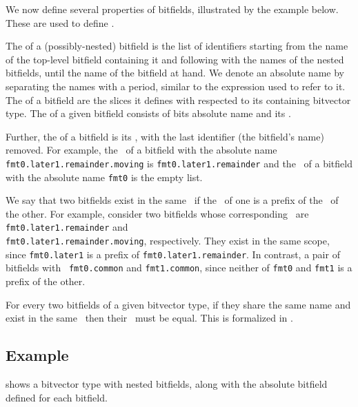 We now define several properties of bitfields, illustrated by the example below.
These are used to define .

The \hypertarget{def-absolutename}{\absolutename} of a (possibly-nested) bitfield is the list of identifiers starting from the
name of the top-level bitfield containing it and following with the names of the nested bitfields,
until the name of the bitfield at hand. We denote an absolute name by separating the names with a
period, similar to the expression used to refer to it.
%
The \hypertarget{def-absoluteslice}{\absoluteslice} of a bitfield are the slices it defines with respected to its containing
bitvector type.
%
The \hypertarget{def-absolutebitfield}{\absolutebitfield} of a given bitfield consists of bits absolute name and its
\absoluteslices.

Further, the \hypertarget{def-bitfieldscope}{\bitfieldscope} of a bitfield is its \absolutename, with the last
identifier (the bitfield's name) removed.
For example, the \bitfieldscope\ of a bitfield with the absolute name \texttt{fmt0.later1.remainder.moving}
is \texttt{fmt0.later1.remainder} and the \bitfieldscope\ of a bitfield with the absolute name
\texttt{fmt0} is the empty list.

We say that two bitfields exist in the same \bitfieldscope\ if the \bitfieldscope\ of one is a prefix
of the \bitfieldscope\ of the other. For example, consider two bitfields whose corresponding \absolutenames\ are
\texttt{fmt0.later1.remainder} and \\
\texttt{fmt0.later1.remainder.moving}, respectively.
They exist in the same scope, since \texttt{fmt0.later1} is a prefix of
\texttt{fmt0.later1.remainder}.
In contrast, a pair of bitfields with \absolutenames\ \texttt{fmt0.common}
and \texttt{fmt1.common}, since neither of \texttt{fmt0} and \texttt{fmt1} is a prefix of the other.

For every two bitfields of a given bitvector type,
if they share the same name and exist in the same \bitfieldscope\ then their \absoluteslices\ must be
equal.
This is formalized in .

\subsection{Example}
 shows a bitvector type with nested bitfields, along with the absolute bitfield
defined for each bitfield.


